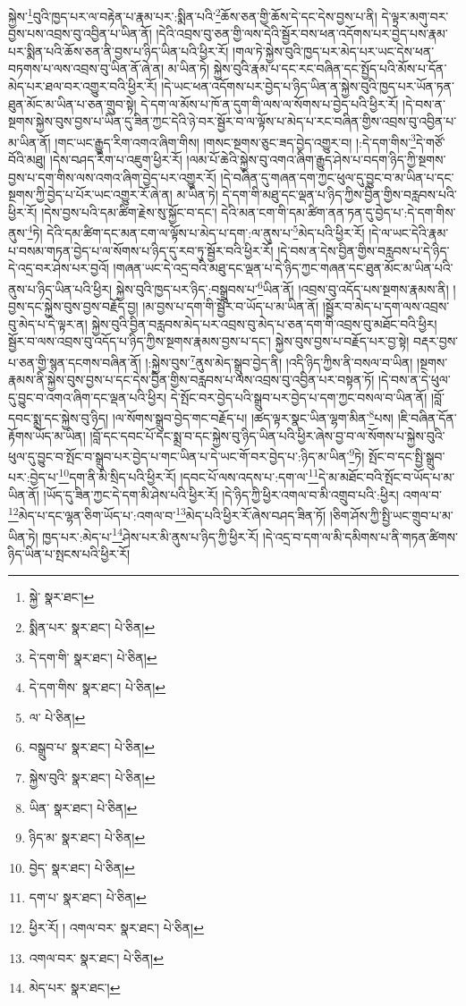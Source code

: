 སྐྱེས་\footnote{སྐྱེ་  སྣར་ཐང་། }བུའི་ཁྱད་པར་ལ་བརྟེན་པ་རྣམ་པར་:སྨིན་པའི་\footnote{སྨིན་པར་  སྣར་ཐང་།  པེ་ཅིན། }ཆོས་ཅན་གྱི་ཆོས་དེ་དང་དེས་བྱས་པ་ནི། དེ་ལྟར་མགུ་བར་བྱས་པས་འབྲས་བུ་འབྱིན་པ་ཡིན་ནོ། །དེའི་འབྲས་བུ་ཅན་གྱི་ལས་དེའི་སྦྱོར་བས་ཕན་འདོགས་པར་བྱེད་པས་རྣམ་པར་སྨིན་པའི་ཆོས་ཅན་ནི་བྱས་པ་ཉིད་ཡིན་པའི་ཕྱིར་རོ། །གལ་ཏེ་སྐྱེས་བུའི་ཁྱད་པར་མེད་པར་ཡང་དེས་ཕན་བཏགས་པ་ལས་འབྲས་བུ་ཡིན་ནོ་ཞེ་ན། མ་ཡིན་ཏེ། སྐྱེས་བུའི་རྣམ་པ་དང་རང་བཞིན་དང་སྤྱོད་པའི་མོས་པ་དོན་མེད་པར་ཐལ་བར་འགྱུར་བའི་ཕྱིར་རོ། །དེ་ཡང་ཕན་འདོགས་པར་བྱེད་པ་ཉིད་ཡིན་ན་སྐྱེས་བུའི་ཁྱད་པར་ཡོན་ཏན་ཐུན་མོང་མ་ཡིན་པ་ཅན་གྲུབ་སྟེ། དེ་དག་ལ་མོས་པ་ཁོ་ན་དུག་གི་ལས་ལ་སོགས་པ་བྱེད་པའི་ཕྱིར་རོ། །དེ་བས་ན་སྔགས་སྐྱེས་བུས་བྱས་པ་ཡིན་དུ་ཟིན་ཀྱང་དེའི་ཉེ་བར་སྦྱོར་བ་ལ་ལྟོས་པ་མེད་པ་རང་བཞིན་གྱིས་འབྲས་བུ་འབྱིན་པ་མ་ཡིན་ནོ། །གང་ཡང་རྒྱུད་རིག་འགའ་ཞིག་གིས། །གསང་སྔགས་ཅུང་ཟད་བྱེད་འགྱུར་བ། །:དེ་དག་གིས་\footnote{དེ་དག་གི་  སྣར་ཐང་།  པེ་ཅིན། }དེ་གཙོ་བོའི་མཐུ། །དེས་བཤད་རིག་པ་འཇུག་ཕྱིར་རོ། །ལམ་པོ་ཆེའི་སྐྱེས་བུ་འགའ་ཞིག་རྒྱུད་ཤེས་པ་བདག་ཉིད་ཀྱི་སྔགས་བྱས་པ་དག་གིས་ལས་འགའ་ཞིག་བྱེད་པར་འགྱུར་རོ། །དེ་བཞིན་དུ་གཞན་དག་ཀྱང་ཕུལ་དུ་བྱུང་བ་མ་ཡིན་པ་དང་སྔགས་ཀྱི་བྱེད་པ་པོར་ཡང་འགྱུར་རོ་ཞེ་ན། མ་ཡིན་ཏེ། དེ་དག་གི་མཐུ་དང་ལྡན་པ་ཉིད་ཀྱིས་བྱིན་གྱིས་བརླབས་པའི་ཕྱིར་རོ། །དེས་བྱས་པའི་དམ་ཚིག་རྗེས་སུ་སྐྱོང་བ་དང་། དེའི་མན་ངག་གི་དམ་ཚིག་ནན་ཏན་དུ་བྱེད་པ་:དེ་དག་གིས་ནུས་\footnote{དེ་དག་གིས་  སྣར་ཐང་།  པེ་ཅིན། }ཏེ། དེའི་དམ་ཚིག་དང་མན་ངག་ལ་ལྟོས་པ་མེད་པ་དག་:ལ་ནུས་པ་\footnote{ལ་  པེ་ཅིན། }མེད་པའི་ཕྱིར་རོ། །དེ་ལ་ཡང་དེའི་རྣམ་པ་བསམ་གཏན་བྱེད་པ་ལ་སོགས་པ་ཉིད་དུ་རབ་ཏུ་སྦྱོར་བའི་ཕྱིར་རོ། །དེ་བས་ན་དེས་བྱིན་གྱིས་བརླབས་པ་དེ་ཉིད་དེ་འདྲ་བར་ཤེས་པར་བྱའོ། །གཞན་ཡང་དེ་འདྲ་བའི་མཐུ་དང་ལྡན་པ་དེ་ཉིད་ཀྱང་གཞན་དང་ཐུན་མོང་མ་ཡིན་པའི་ནུས་པ་ཉིད་ཡིན་པའི་ཕྱིར། སྐྱེས་བུའི་ཁྱད་པར་ཉིད་:བསྒྲུབས་པ་\footnote{བསྒྲུབ་པ་  སྣར་ཐང་།  པེ་ཅིན། }ཡིན་ནོ། །འབྲས་བུ་འདོད་པས་སྔགས་རྣམས་ནི། །བྱས་དང་སྐྱེས་བུས་བྱས་བརྗོད་བྱ། །མ་བྱས་པ་དག་གི་སྦྱོར་བ་ཡོད་པ་མ་ཡིན་ནོ། །སྦྱོར་བ་མེད་པ་དག་ལས་འབྲས་བུ་མེད་པ་དེ་ལྟར་ན། སྐྱེས་བུའི་བྱིན་བརླབས་མེད་པར་འབྲས་བུ་མེད་པ་ཅན་དག་གི་འབྲས་བུ་མཐོང་བའི་ཕྱིར། སྦྱོར་བ་ལས་འབྲས་བུ་འདོད་པ་ཉིད་ཀྱིས་སྔགས་རྣམས་བྱས་པ་དང་། སྐྱེས་བུས་བྱས་པ་བརྗོད་པར་བྱ་སྟེ། བརྡར་བྱས་པ་ཅན་གྱི་སྙན་དངགས་བཞིན་ནོ། །:སྐྱེས་བུས་\footnote{སྐྱེས་བུའི་  སྣར་ཐང་།  པེ་ཅིན། }ནུས་མེད་སྒྲུབ་བྱེད་ནི། །འདི་ཉིད་ཀྱིས་ནི་བསལ་བ་ཡིན། །སྔགས་རྣམས་ནི་སྐྱེས་བུས་བྱས་པ་དང་དེས་བྱིན་གྱིས་བརླབས་པ་ལས་འབྲས་བུ་འབྱིན་པར་བསྟན་ཏོ། །དེ་བས་ན་དེ་ཕུལ་དུ་བྱུང་བ་འགའ་ཞིག་དང་ལྡན་པའི་ཕྱིར། དེ་སྤོང་བར་བྱེད་པའི་སྒྲུབ་པར་བྱེད་པ་དག་ཀྱང་བསལ་བ་ཡིན་ནོ། །བློ་དབང་སྨྲ་དང་སྐྱེས་བུ་ཉིད། །ལ་སོགས་སྒྲུབ་བྱེད་གང་བརྗོད་པ། །ཚད་ལྟར་སྣང་ཡིན་ལྷག་མིན་\footnote{ཡིན་  སྣར་ཐང་།  པེ་ཅིན། }པས། །ཇི་བཞིན་དོན་རྟོགས་ཡོད་མ་ཡིན། །བློ་དང་དབང་པོ་དང་སྨྲ་བ་དང་སྐྱེས་བུ་ཉིད་ཡིན་པའི་ཕྱིར་ཞེས་བྱ་བ་ལ་སོགས་པ་སྐྱེས་བུའི་ཕུལ་དུ་བྱུང་བ་སྤོང་བ་སྒྲུབ་པར་བྱེད་པ་གང་ཡིན་པ་དེ་ཡང་གོ་བར་བྱེད་པ་:ཉིད་མ་ཡིན་\footnote{ཉིད་མ་  སྣར་ཐང་།  པེ་ཅིན། }ཏེ། སྤོང་བ་དང་སྤྱི་སྒྲུབ་པར་:བྱེད་པ་\footnote{བྱེད་  སྣར་ཐང་།  པེ་ཅིན། }དག་ནི་མི་སྲིད་པའི་ཕྱིར་རོ། །དབང་པོ་ལས་འདས་པ་:དག་ལ་\footnote{དག་པ་  སྣར་ཐང་།  པེ་ཅིན། }དེ་མ་མཐོང་བའི་སྤོང་བ་ཡོད་པ་མ་ཡིན་ནོ། །ཡོད་དུ་ཟིན་ཀྱང་དེ་དག་མི་ཤེས་པའི་ཕྱིར་རོ། །དེ་ཉིད་ཀྱི་ཕྱིར་འགལ་བ་མི་འགྲུབ་པའི་:ཕྱིར། འགལ་བ་\footnote{ཕྱིར་རོ། ། འགལ་བར་  སྣར་ཐང་།  པེ་ཅིན། }མེད་པ་དང་ལྷན་ཅིག་ཡོད་པ་:འགལ་བ་\footnote{འགལ་བར་  སྣར་ཐང་།  པེ་ཅིན། }མེད་པའི་ཕྱིར་རོ་ཞེས་བཤད་ཟིན་ཏོ། །ཅིག་ཤོས་ཀྱི་སྤྱི་ཡང་གྲུབ་པ་མ་ཡིན་ཏེ། ཁྱད་པར་:མེད་པ་\footnote{མེད་པར་  སྣར་ཐང་། }ཤེས་པར་མི་ནུས་པ་ཉིད་ཀྱི་ཕྱིར་རོ། །དེ་འདྲ་བ་དག་ལ་མི་དམིགས་པ་ནི་གཏན་ཚིགས་ཉིད་ཡིན་པ་སྤངས་པའི་ཕྱིར་རོ། 